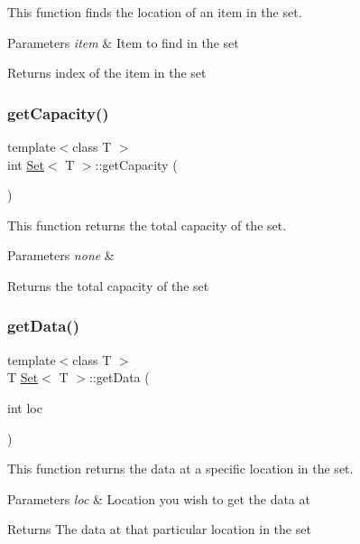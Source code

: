This function finds the location of an item in the set.


\begin{DoxyParams}{Parameters}
{\em item} & Item to find in the set \\
\hline
\end{DoxyParams}
\begin{DoxyReturn}{Returns}
index of the item in the set 
\end{DoxyReturn}
\mbox{\label{class_set_a242561b28705ae5b17e1b4e46e893af4}} 
\subsubsection{\texorpdfstring{get\+Capacity()}{getCapacity()}}
{\footnotesize\ttfamily template$<$class T $>$ \\
int \hyperlink{class_set}{Set}$<$ T $>$\+::get\+Capacity (\begin{DoxyParamCaption}{ }\end{DoxyParamCaption})}

This function returns the total capacity of the set.


\begin{DoxyParams}{Parameters}
{\em none} & \\
\hline
\end{DoxyParams}
\begin{DoxyReturn}{Returns}
the total capacity of the set 
\end{DoxyReturn}
\mbox{\label{class_set_a4989b0d383c94f67e33641b8b54ad7eb}} 
\subsubsection{\texorpdfstring{get\+Data()}{getData()}}
{\footnotesize\ttfamily template$<$class T $>$ \\
T \hyperlink{class_set}{Set}$<$ T $>$\+::get\+Data (\begin{DoxyParamCaption}\item[{int}]{loc }\end{DoxyParamCaption})}

This function returns the data at a specific location in the set.


\begin{DoxyParams}{Parameters}
{\em loc} & Location you wish to get the data at \\
\hline
\end{DoxyParams}
\begin{DoxyReturn}{Returns}
The data at that particular location in the set 
\end{DoxyReturn}
\mbox{\label{class_set_a06e2cc25660f6a4ff0d9b7af372f2a5e}} 
